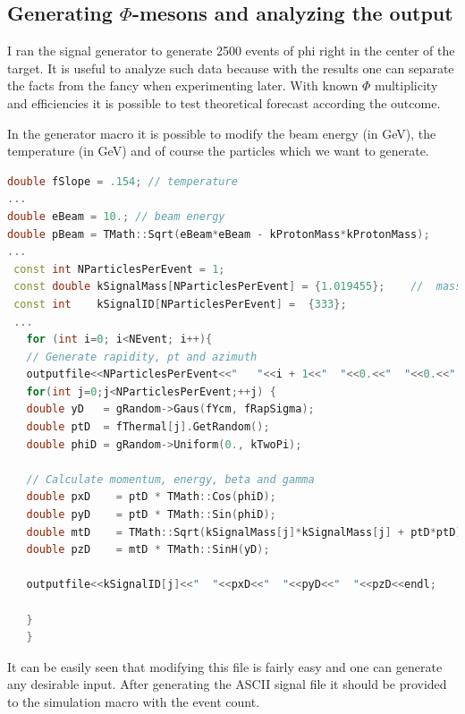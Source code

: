\documentclass[a4paper,12pt]{article}
\begin{document}
\subsection{ Generating $\Phi$-mesons and analyzing the output}
\vspace{5mm}
\par I ran the signal generator to generate 2500 events of phi right in the center of the target. It is useful to analyze such data because with the results one can separate the facts from the fancy when experimenting later. With known $\Phi$ multiplicity and efficiencies it is possible to test theoretical forecast according the outcome.
\par In the generator macro it is possible to modify the beam energy (in GeV), the temperature (in GeV) and of course the particles which we want to generate.
\begin{lstlisting}[language=C++]
double fSlope = .154; // temperature
...
double eBeam = 10.; // beam energy
double pBeam = TMath::Sqrt(eBeam*eBeam - kProtonMass*kProtonMass);
...
 const int NParticlesPerEvent = 1;
 const double kSignalMass[NParticlesPerEvent] = {1.019455};    //  mass in GeV
 const int    kSignalID[NParticlesPerEvent] =  {333};
 ...
   for (int i=0; i<NEvent; i++){
   // Generate rapidity, pt and azimuth
   outputfile<<NParticlesPerEvent<<"   "<<i + 1<<"  "<<0.<<"  "<<0.<<"  "<<0.<<endl;
   for(int j=0;j<NParticlesPerEvent;++j) {      
   double yD   = gRandom->Gaus(fYcm, fRapSigma);
   double ptD  = fThermal[j].GetRandom();
   double phiD = gRandom->Uniform(0., kTwoPi);
   
   // Calculate momentum, energy, beta and gamma
   double pxD    = ptD * TMath::Cos(phiD);
   double pyD    = ptD * TMath::Sin(phiD);
   double mtD    = TMath::Sqrt(kSignalMass[j]*kSignalMass[j] + ptD*ptD);
   double pzD    = mtD * TMath::SinH(yD);
   
   outputfile<<kSignalID[j]<<"  "<<pxD<<"  "<<pyD<<"  "<<pzD<<endl;
   
   }
   }
\end{lstlisting}
\par It can be easily seen that modifying this file is fairly easy and one can generate any desirable input. After generating the ASCII signal file it should be provided to the simulation macro with the event count.
\end{document}
